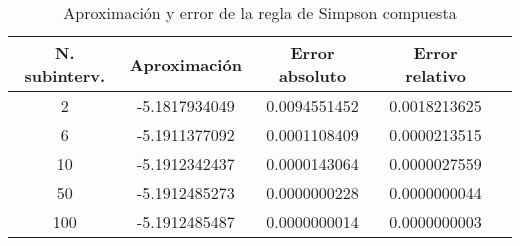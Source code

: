 \begin{table}[H]
  \begin{center}
    \begin{tabular}{|c|c|c|c|c|} \hline 
      \textbf{N. subinterv.} & \textbf{Aproximaci\'on} & \textbf{Error absoluto} & \textbf{Error relativo}\\ 
      \hline
      2 & -5.1817934049 & 0.0094551452 & 0.0018213625
      \\
      \hline
      6 & -5.1911377092 & 0.0001108409 & 0.0000213515
      \\
      \hline
      10 & -5.1912342437 & 0.0000143064 & 0.0000027559
      \\
      \hline
      50 & -5.1912485273 & 0.0000000228 & 0.0000000044
      \\
      \hline
      100 & -5.1912485487 & 0.0000000014 & 0.0000000003
      \\
      \hline
    \end{tabular}
  \end{center}
  \caption{Aproximaci\'on y error de la regla de Simpson compuesta}
  \label{tab:4}
\end{table}

